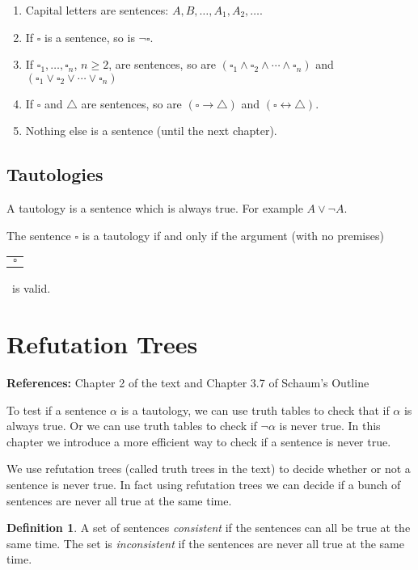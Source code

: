 \documentclass[letterpaper, 11pt]{article}
\theoremstyle{definition}
\newtheorem{definition}[theorem]{Definition}
\begin{document}
\begin{enumerate}
\item Capital letters are sentences: $A, B, \ldots, A_1, A_2,\ldots$.
\item If $\square$ is a sentence, so is $\neg \square$.
\item If $\square_1,\ldots, \square_n$, $n\ge 2$, are sentences, so are $(\square_1\wedge \square_2\wedge \cdots \wedge \square_n)$ and $(\square_1\vee \square_2 \vee \cdots \vee \square_n)$
\item If $\square$ and $\triangle$ are sentences, so are $(\square \to \triangle)$ and $(\square \leftrightarrow\triangle)$.
\item Nothing else is a sentence (until the next chapter).
\end{enumerate}


\subsection{Tautologies}

A tautology is a sentence which is always true. For example $A\vee \neg A$.

The sentence $\square$ is a tautology if and only if the argument (with no premises)
\ \begin{tabular}{l}
\\\hline
\rule{0pt}{12pt}
$\square$
\end{tabular}\ 
is valid. 



\newpage
\section{Refutation Trees}



{\bf References:} Chapter 2 of the text and Chapter 3.7 of Schaum's Outline

To test if a sentence $\alpha$ is a tautology, we can use truth tables to check that if $\alpha$ is always true. Or we can use truth tables to check if $\neg \alpha$ is never true. In this chapter we introduce a more efficient way to check if a sentence is never true.

We use refutation trees (called truth trees in the text) to decide whether or not a sentence is never true. In fact using refutation trees we can decide if a bunch of sentences are never all true at the same time.

\begin{definition} A set of sentences {\em consistent} if the sentences can all be true at the same time. The set is {\em inconsistent} if the sentences are never all true at the same time.
\end{definition}
\end{document}
